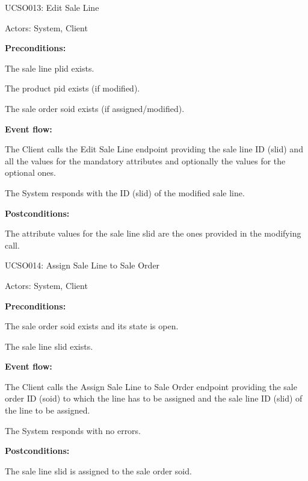 \begin{ucbox}{UCSO013: Edit Sale Line}
\label{UCSO013}

Actors: System, Client

\textbf{Preconditions:}

\ucitem The sale line plid exists.

\ucitem The product pid exists (if modified).

\ucitem The sale order soid exists (if assigned/modified).

\textbf{Event flow:}

\ucitem The Client calls the Edit Sale Line endpoint providing the sale line ID (slid) and all the values for the mandatory attributes and optionally the values for the optional 
ones.

\ucitem The System responds with the ID (slid) of the modified sale line.

\textbf{Postconditions:}

\ucitem The attribute values for the sale line slid are the ones provided in the modifying call.

\end{ucbox}

\begin{ucbox}{UCSO014: Assign Sale Line to Sale Order}
\label{UCSO014}

Actors: System, Client

\textbf{Preconditions:}

\ucitem The sale order soid exists and its state is open.

\ucitem The sale line slid exists.

\textbf{Event flow:}

\ucitem The Client calls the Assign Sale Line to Sale Order endpoint providing the sale order ID (soid) to which the line has to be assigned and the sale line ID (slid) of the 
line to be assigned.

\ucitem The System responds with no errors.

\textbf{Postconditions:}

\ucitem The sale line slid is assigned to the sale order soid.

\end{ucbox}

